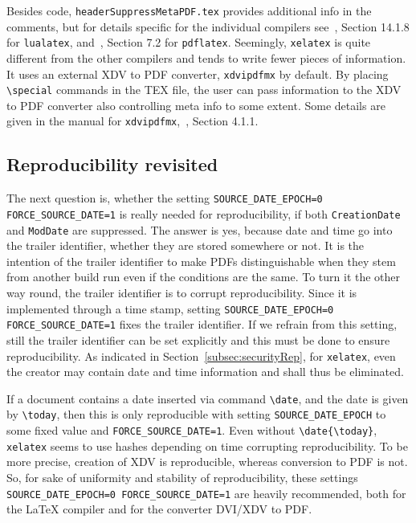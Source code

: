 \documentclass[a4paper, english]{article}%
\newcommand{\pdflatex}{\texttt{pdflatex}}
\newcommand{\lualatex}{\texttt{lualatex}}
\newcommand{\xelatex}{\texttt{xelatex}}
\newcommand{\cmd}[1]{\texttt{\textbackslash#1}}
\begin{document}
Besides code, \texttt{headerSuppressMetaPDF.tex} provides 
additional info in the comments, 
but for details specific for the individual compilers 
see~\cite{LuaTexRef24}, Section 14.1.8 for \lualatex, 
and~\cite{PdfTexUsr}, Section 7.2 for \pdflatex. 
Seemingly, \xelatex{} is quite different from the other compilers 
and tends to write fewer pieces of information. 
It uses an external XDV to PDF converter, \texttt{xdvipdfmx} by default. 
By placing \cmd{special} commands in the TEX file, 
the user can pass information to the XDV to PDF converter 
also controlling meta info to some extent. 
Some details are given in the 
manual for \texttt{xdvipdfmx},~\cite{DviPdfMx}, Section 4.1.1. 


\subsection{Reproducibility revisited}\label{subsec:reprod2}

The next question is, 
whether the setting \texttt{SOURCE\_DATE\_EPOCH=0 FORCE\_SOURCE\_DATE=1} 
is really needed for reproducibility, 
if both \texttt{CreationDate} and \texttt{ModDate} are suppressed. 
The answer is yes, because date and time go into the trailer identifier, 
whether they are stored somewhere or not. 
It is the intention of the trailer identifier to make PDFs distinguishable 
when they stem from another build run even if the conditions are the same. 
To turn it the other way round, the trailer identifier 
is to corrupt reproducibility. 
Since it is implemented through a time stamp, 
setting \texttt{SOURCE\_DATE\_EPOCH=0 FORCE\_SOURCE\_DATE=1} 
fixes the trailer identifier. 
If we refrain from this setting, 
still the trailer identifier can be set explicitly 
and this must be done to ensure reproducibility. 
As indicated in Section~\ref{subsec:securityRep}, 
for \xelatex, even the creator may contain date and time information 
and shall thus be eliminated. 

If a document contains a date inserted via command \cmd{date}, 
and the date is given by \cmd{today}, 
then this is only reproducible 
with setting \texttt{SOURCE\_DATE\_EPOCH} to some fixed value and \texttt{FORCE\_SOURCE\_DATE=1}. 
Even without \cmd{date\{\cmd{today}\}}, \xelatex{} seems to use hashes depending on time 
corrupting reproducibility. 
To be more precise, creation of XDV is reproducible, 
whereas conversion to PDF is not. 
So, for sake of uniformity and stability of reproducibility, 
these settings \texttt{SOURCE\_DATE\_EPOCH=0 FORCE\_SOURCE\_DATE=1} are heavily recommended, 
both for the \LaTeX{} compiler and for the converter DVI/XDV to PDF\@. 
\end{document}
